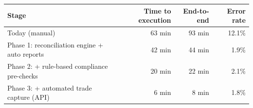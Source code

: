 \begin{tabular}{@{}lrrr@{}}
\toprule
\textbf{Stage} & \textbf{Time to execution} & \textbf{End-to-end} & \textbf{Error rate} \\
\midrule
Today (manual) & 63 min & 93 min & 12.1\% \\
Phase 1: reconciliation engine + auto reports & 42 min & 44 min & 1.9\% \\
Phase 2: + rule-based compliance pre-checks & 20 min & 22 min & 2.1\% \\
Phase 3: + automated trade capture (API) & 6 min & 8 min & 1.8\% \\
\bottomrule
\end{tabular}